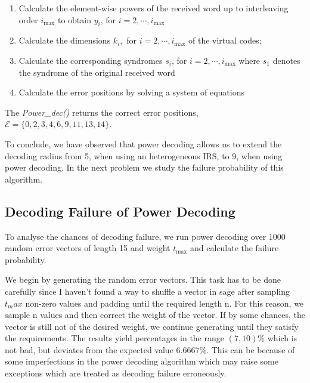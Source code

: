\documentclass{article}
\begin{document}
\begin{enumerate}
\item Calculate the element-wise powers of the received word up to interleaving order $i_{\text{max}}$ to obtain $y_i$, for $i = 2, \cdots, i_{\text{max}}$
\item Calculate the dimensions $k_i,$ for $i = 2, \cdots, i_{\text{max}}$ of the virtual codes;
\item Calculate the corresponding syndromes $s_i$, for $i = 2, \cdots, i_{\text{max}}$ where $s_1$ denotes the syndrome of the original received word
\item Calculate the error positions by solving a system of equations
\end{enumerate}
The \textit{Power\_dec()} returns the correct error positions,  $\mathcal{E} = \{0, 2, 3, 4, 6, 9, 11, 13, 14\}$.

To conclude, we have observed that power decoding allows us to extend the decoding radius from 5, when using an heterogeneous IRS, to 9, when using power decoding. In the next problem we study the failure probability of this algorithm.

\subsection*{Decoding Failure of Power Decoding}
To analyse the chances of decoding failure, we run power decoding over 1000 random error vectors of length 15 and weight $t_{\text{max}}$ and calculate the failure probability.

We begin by generating the random error vectors. This task has to be done carefully since I haven't found a way to shuffle a vector in sage after sampling $t_max $ non-zero values and padding until the required length n. For this reason, we sample n values and then correct the weight of the vector. If by some chances, the vector is still not of the desired weight, we continue generating until they satisfy the requirements. The results yield percentages in the range $(7,10)\%$ which is not bad, but deviates from the expected value $6.6667\%$. This can be because of some imperfections in the power decoding algorithm which may raise some exceptions which are treated as decoding failure erroneously.

%
\end{document}
